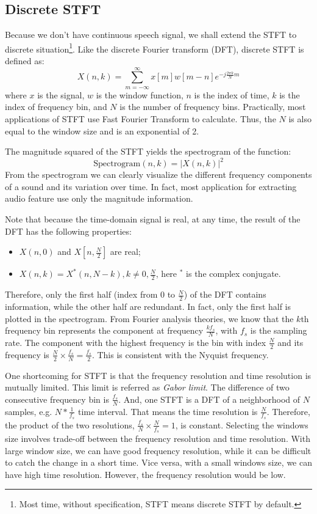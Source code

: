 \documentclass[11pt,a4paper]{report}
\begin{document}
\subsection{Discrete STFT}
Because we don't have continuous speech signal, we shall extend the STFT to discrete situation\footnote{Most time, without specification, STFT means discrete STFT by default.}. Like the discrete Fourier transform (DFT), discrete STFT is defined as:
\[ X(n, k) = \sum_{m = -\infty}^{\infty} x[m]w[m-n]e^{-j \frac{2\pi k}{N} m} \]
where $x$ is the signal, $w$ is the window function, $n$ is the index of time, $k$ is the index of frequency bin, and $N$ is the number of frequency bins. Practically, most applications of STFT use Fast Fourier Transform to calculate. Thus, the $N$ is also equal to the window size and is an exponential of 2.

The magnitude squared of the STFT yields the spectrogram of the function:
\[ \text{Spectrogram}(n, k) = \left|X(n,k)\right|^2 \]
From the spectrogram we can clearly visualize the different frequency components of a sound and its variation over time. In fact, most application for extracting audio feature use only the magnitude information.

Note that because the time-domain signal is real, at any time, the result of the DFT has the following properties:
\begin{itemize}
  \item $X(n,0)$ and $X[n, \frac{N}{2}]$ are real;
  \item $X(n,k) = X^*(n,N-k), k \neq 0, \frac{N}{2}$, here $^*$ is the complex conjugate.
\end{itemize}
Therefore, only the first half (index from $0$ to $\frac{N}{2}$) of the DFT contains information, while the other half are redundant. In fact, only the first half is plotted in the spectrogram. From Fourier analysis theories, we know that the $k$th frequency bin represents the component at frequency $\frac{kf_s}{N}$, with $f_s$ is the sampling rate. The component with the highest frequency is the bin with index $\frac{N}{2}$ and its frequency is $\frac{N}{2} \times \frac{f_s}{N} = \frac{f_s}{2}$. This is consistent with the Nyquist frequency.

One shortcoming for STFT is that the frequency resolution and time resolution is mutually limited. This limit is referred as \textit{Gabor limit}. The difference of two consecutive frequency bin is $\frac{f_s}{N}$. And, one STFT is a DFT of a neighborhood of $N$ samples, e.g. $N * \frac{1}{f_s}$ time interval. That means the time resolution is $\frac{N}{f_s}$. Therefore, the product of the two resolutions, $\frac{f_s}{N} \times \frac{N}{f_s} = 1$, is constant. Selecting the windows size involves trade-off between the frequency resolution and time resolution. With large window size, we can have good frequency resolution, while it can be difficult to catch the change in a short time. Vice versa, with a small windows size, we can have high time resolution. However, the frequency resolution would be low.
\end{document}
